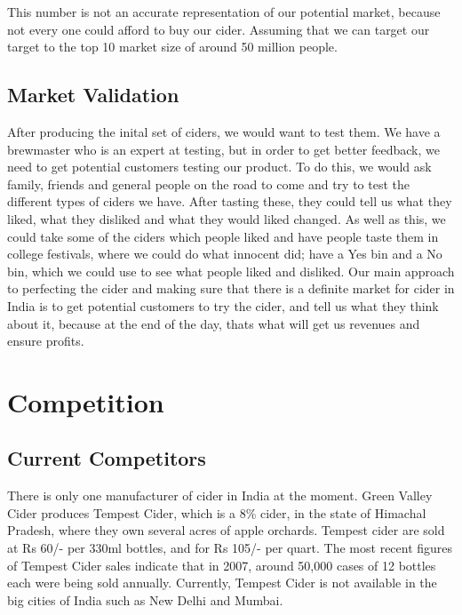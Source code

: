 \documentclass[11pt]{article}
\begin{document}
		This number is not an accurate representation of our potential market,
		because not every one could afford to buy our cider. Assuming that
		we can target our target to the top 10%
		market size of around 50 million people.

  \subsection{Market Validation}
  After producing the inital set of ciders, we would want to test them. We have
  a brewmaster who is an expert at testing, but in order to get better feedback,
  we need to get potential customers testing our product. To do this, we would
  ask family, friends and general people on the road to come and try to test
  the different types of ciders we have. After tasting these, they could tell us
  what they liked, what they disliked and what they would liked changed.
  As well as this, we could take some of the ciders which people liked and have
  people taste them in college festivals, where we could do what innocent did;
  have a Yes bin and a No bin, which we could use to see what people liked and
  disliked.
  Our main approach to perfecting the cider and making sure that there is a
  definite market for cider in India is to get potential customers to try the cider,
  and tell us what they think about it, because at the end of the day, thats 
  what will get us revenues and ensure profits. 

\newpage
\section{Competition}
	\subsection{Current Competitors}
There is only one manufacturer of cider in India at the moment. Green Valley Cider produces Tempest Cider, which is a 8\% cider, in the state of Himachal Pradesh, where they own several acres of apple orchards. Tempest cider are sold at Rs 60/- per 330ml bottles, and for Rs 105/- per quart. The most recent figures of Tempest Cider sales indicate that in 2007, around 50,000 cases of 12 bottles each were being sold annually. Currently, Tempest Cider is not available in the big cities of India such as New Delhi and Mumbai. \\
\end{document}
